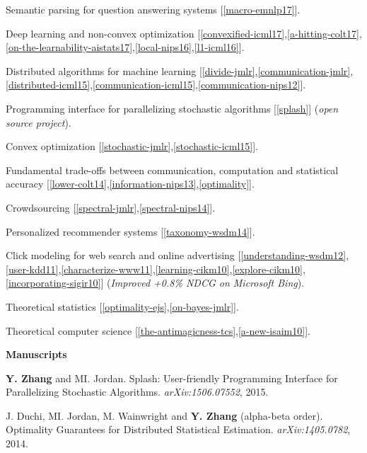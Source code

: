 \documentclass{res} %
\newenvironment{my_item}{
\begin{itemize}
  \setlength{\itemsep}{0pt}
  \setlength{\parskip}{0pt}
  \setlength{\parsep}{0pt}}
{\end{itemize}
}
\begin{document}
\begin{resume}
\vspace{5pt}
\begin{my_item}
\item Semantic parsing for question answering systems [\ref{macro-emnlp17}].
\item Deep learning and non-convex optimization [\ref{convexified-icml17},\ref{a-hitting-colt17},\ref{on-the-learnability-aistats17},\ref{local-nips16},\ref{l1-icml16}].
\item Distributed algorithms for machine learning [\ref{divide-jmlr},\ref{communication-jmlr},\ref{distributed-icml15},\ref{communication-icml15},\ref{communication-nips12}].
\item Programming interface for parallelizing stochastic algorithms [\ref{splash}] (\emph{open source project}). 
\item Convex optimization [\ref{stochastic-jmlr},\ref{stochastic-icml15}].
\item Fundamental trade-offs between communication, computation and statistical accuracy [\ref{lower-colt14},\ref{information-nips13},\ref{optimality}].
\item Crowdsourcing [\ref{spectral-jmlr},\ref{spectral-nips14}].
\item Personalized recommender systems [\ref{taxonomy-wsdm14}].
\item Click modeling for web search and online advertising [\ref{understanding-wsdm12},\ref{user-kdd11},\ref{characterize-www11},\ref{learning-cikm10},\ref{explore-cikm10},\ref{incorporating-sigir10}] (\emph{Improved +0.8\% NDCG on Microsoft Bing}).
\item Theoretical statistics [\ref{optimality-ejs},\ref{on-bayes-jmlr}].
\item Theoretical computer science [\ref{the-antimagicness-tcs},\ref{a-new-isaim10}].
\end{my_item}

{\bf\Large Manuscripts}
\vspace{5pt}

\begin{enumerate}[label={[M\arabic*]}, ref={M\arabic*}]
\item \label{splash}\textbf{Y. Zhang} and MI. Jordan. Splash: User-friendly Programming Interface for Parallelizing Stochastic Algorithms. \emph{arXiv:1506.07552}, 2015.

\item J. Duchi, MI. Jordan, M. Wainwright and \textbf{Y. Zhang} (alpha-beta order). Optimality Guarantees for Distributed Statistical Estimation. \emph{arXiv:1405.0782}, 2014.\label{optimality}
\end{enumerate}


\end{resume}
\end{document}
